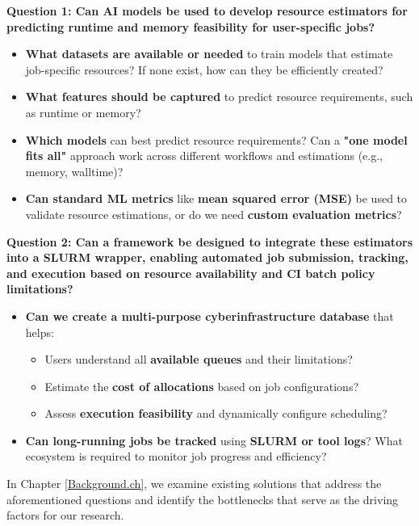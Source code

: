 \textbf{Question 1: Can AI models be used to develop resource estimators for predicting runtime and memory feasibility for user-specific jobs?}  

\begin{itemize}
    \item \textbf{What datasets are available or needed} to train models that estimate job-specific resources? If none exist, how can they be efficiently created?  
    \item \textbf{What features should be captured} to predict resource requirements, such as runtime or memory?  
    \item \textbf{Which models} can best predict resource requirements? Can a \textbf{"one model fits all"} approach work across different workflows and estimations (e.g., memory, walltime)?  
    \item \textbf{Can standard ML metrics} like \textbf{mean squared error (MSE)} be used to validate resource estimations, or do we need \textbf{custom evaluation metrics}?  
\end{itemize}


\textbf{Question 2: Can a framework be designed to integrate these estimators into a SLURM wrapper, enabling automated job submission, tracking, and execution based on resource availability and CI batch policy limitations?}

\begin{itemize}
    \item \textbf{Can we create a multi-purpose cyberinfrastructure database} that helps:  
    \begin{itemize}
        \item Users understand all \textbf{available queues} and their limitations?  
        \item Estimate the \textbf{cost of allocations} based on job configurations?  
        \item Assess \textbf{execution feasibility} and dynamically configure scheduling?  
    \end{itemize}
    \item \textbf{Can long-running jobs be tracked} using \textbf{SLURM or tool logs}? What ecosystem is required to monitor job progress and efficiency?  
\end{itemize}

In Chapter \ref{Background.ch}, we examine existing solutions that address the aforementioned questions and identify the bottlenecks that serve as the driving factors for our research.




